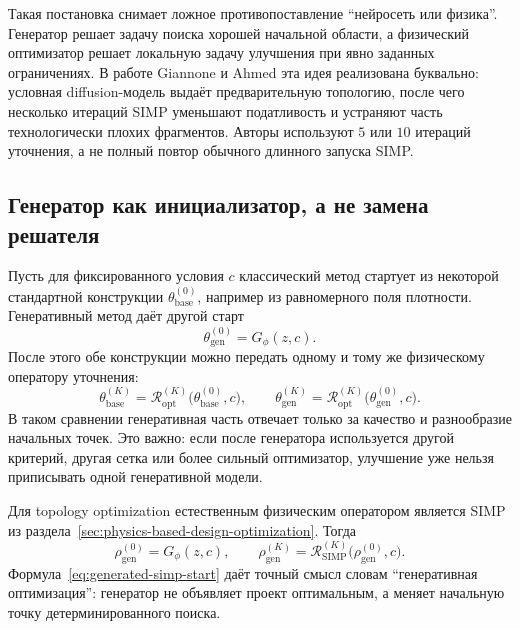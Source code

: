 Такая постановка снимает ложное противопоставление ``нейросеть или физика''. Генератор решает задачу поиска хорошей начальной области, а физический оптимизатор решает локальную задачу улучшения при явно заданных ограничениях. В работе Giannone и Ahmed эта идея реализована буквально: условная diffusion-модель выдаёт предварительную топологию, после чего несколько итераций SIMP уменьшают податливость и устраняют часть технологически плохих фрагментов. Авторы используют $5$ или $10$ итераций уточнения, а не полный повтор обычного длинного запуска SIMP.

\subsection{Генератор как инициализатор, а не замена решателя}

Пусть для фиксированного условия $c$ классический метод стартует из некоторой стандартной конструкции $\theta_{\mathrm{base}}^{(0)}$, например из равномерного поля плотности. Генеративный метод даёт другой старт
\begin{equation}
 \theta_{\mathrm{gen}}^{(0)}=G_\phi(z,c).
\end{equation}
После этого обе конструкции можно передать одному и тому же физическому оператору уточнения:
\begin{equation}
 \theta_{\mathrm{base}}^{(K)}
 =\mathcal R_{\mathrm{opt}}^{(K)}
 \bigl(\theta_{\mathrm{base}}^{(0)},c\bigr),
 \qquad
 \theta_{\mathrm{gen}}^{(K)}
 =\mathcal R_{\mathrm{opt}}^{(K)}
 \bigl(\theta_{\mathrm{gen}}^{(0)},c\bigr).
\end{equation}
В таком сравнении генеративная часть отвечает только за качество и разнообразие начальных точек. Это важно: если после генератора используется другой критерий, другая сетка или более сильный оптимизатор, улучшение уже нельзя приписывать одной генеративной модели.

Для topology optimization естественным физическим оператором является SIMP из раздела~\ref{sec:physics-based-design-optimization}. Тогда
\begin{equation}
\label{eq:generated-simp-start}
 \rho_{\mathrm{gen}}^{(0)}=G_\phi(z,c),
 \qquad
 \rho_{\mathrm{gen}}^{(K)}
 =\mathcal R_{\mathrm{SIMP}}^{(K)}
 \bigl(\rho_{\mathrm{gen}}^{(0)},c\bigr).
\end{equation}
Формула~\eqref{eq:generated-simp-start} даёт точный смысл словам ``генеративная оптимизация'': генератор не объявляет проект оптимальным, а меняет начальную точку детерминированного поиска.

